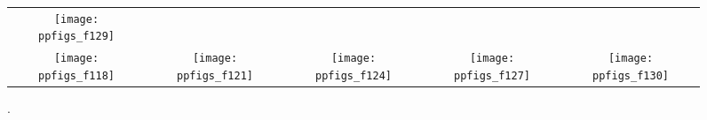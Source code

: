 \documentclass{sig-alternate}
\newcommand{\bbobdatapath}{ppdata/}
\newcommand{\ERT}{\ensuremath{\mathrm{ERT}}}
\begin{document}
\begin{figure*}
\begin{tabular}{@{}c@{}c@{}c@{}c@{}c@{}}
\texttt{[image: ppfigs\_f129]}\\
\texttt{[image: ppfigs\_f118]}&
\texttt{[image: ppfigs\_f121]}&
\texttt{[image: ppfigs\_f124]}&
\texttt{[image: ppfigs\_f127]}&
\texttt{[image: ppfigs\_f130]}
\end{tabular}
\vspace*{-0.2cm}
\caption[Expected running time (\ERT) divided by dimension
versus dimension in log-log presentation]{\label{fig:scaling}
. %
%
}
% 
\end{figure*}
\end{document}
